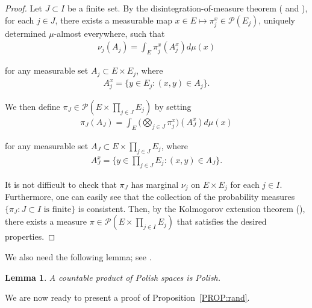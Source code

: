 \documentclass[letterpaper, 11pt,  reqno]{amsart}
\newtheorem{lemma}[theorem]{Lemma}
\newcommand{\1}{\hspace{0.5mm}\text{I}\hspace{0.2mm}}
\newcommand{\noi}{\noindent}
\numberwithin{equation}{section}
\numberwithin{theorem}{section}
\begin{document}
\begin{proof}
Let $J \subset I$ be a finite set. By the disintegration-of-measure theorem 
(\cite[Theorem on p.\,148]{GM} and \cite[Proposition 452O]{Fre}), for each $j \in J$, there exists a measurable map $x \in E \mapsto \pi_j^x\in \mathcal{P} (E_j)$, uniquely determined $\mu$-almost everywhere, such that
\begin{align*}
\nu_j (A_j) = \int_E \pi_j^x (A_j^x) d \mu (x)
\end{align*}

\noi
for any measurable set $A_j \subset E \times E_j$, where
\begin{align*}
A_j^x = \{ y \in E_j : (x, y) \in A_j \}.
\end{align*}

\noi
We then define  $\pi_J \in \mathcal{P} (E \times \prod_{j \in J} E_j)$ by setting
\begin{align*}
\pi_J (A_J) =  \int_E \Big( \bigotimes_{j \in J} \pi_j^x \Big) (A_J^x) d \mu (x)
\end{align*}

\noi
for any measurable set $A_J \subset E \times \prod_{j \in J} E_j$, where
\begin{align*}
A_J^x = \Big\{ y \in \prod_{j \in J} E_j : (x, y) \in A_J \Big\}.
\end{align*}

\noi
It is not difficult to check that $\pi_J$ has marginal $\nu_j$ on $E \times E_j$ for each $j \in I$.
Furthermore, 
one can  easily see that the collection of the probability measures $\{ \pi_J : J \subset I \text{ is finite} \}$ is consistent. Then, by the Kolmogorov extension theorem
(\cite[Appendix D]{Bass}), there exists a measure $\pi \in \mathcal{P} (E \times \prod_{j \in I} E_j)$ that satisfies the desired properties.
\end{proof}


We also need the following lemma; see \cite[(v) on p.\,52]{Sri}.


\begin{lemma}
\label{LEM:polish}
A countable product of Polish spaces is Polish.
\end{lemma}






We are now ready to present a proof of Proposition~\ref{PROP:rand}.
\end{document}
